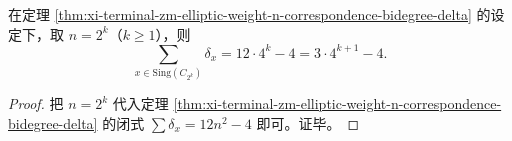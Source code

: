 \begin{corollary}\label{cor:xi-terminal-zm-elliptic-weight-2k-delta-ledger}
在定理 \ref{thm:xi-terminal-zm-elliptic-weight-n-correspondence-bidegree-delta} 的设定下，取 \(n=2^k\)（\(k\ge1\)），则
\[
\sum_{x\in \mathrm{Sing}(C_{2^k})}\delta_x=12\cdot 4^k-4=3\cdot 4^{k+1}-4.
\]
\end{corollary}
\begin{proof}
把 \(n=2^k\) 代入定理 \ref{thm:xi-terminal-zm-elliptic-weight-n-correspondence-bidegree-delta} 的闭式
\(
\sum\delta_x=12n^2-4
\)
即可。证毕。
\end{proof}

